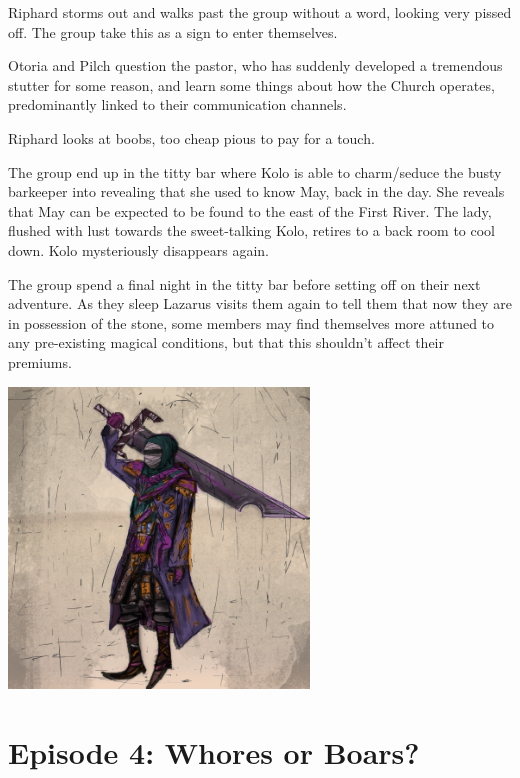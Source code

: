\documentclass[letterpaper,10pt,twoside,twocolumn,openany]{book}
\begin{document}
Riphard storms out and walks past the group without a word, looking very pissed off. The group take this as a sign to enter themselves.

Otoria and Pilch question the pastor, who has suddenly developed a tremendous stutter for some reason, and learn some things about how the Church operates, predominantly linked to their communication channels.

Riphard looks at boobs, too cheap pious to pay for a touch.

The group end up in the titty bar where Kolo is able to charm/seduce the busty barkeeper into revealing that she used to know May, back in the day. She reveals that May can be expected to be found to the east of the First River. The lady, flushed with lust towards the sweet-talking Kolo, retires to a back room to cool down. Kolo mysteriously disappears again.

The group spend a final night in the titty bar before setting off on their next adventure. As they sleep Lazarus visits them again to tell them that now they are in possession of the stone, some members may find themselves more attuned to any pre-existing magical conditions, but that this shouldn't affect their premiums.

\begin{center}
\includegraphics[width=80mm]{./img/otoria1.png}
\begin{figure}[h]
\end{figure}
\end{center}

\clearpage

\section{Episode 4: Whores or Boars?}
\end{document}
